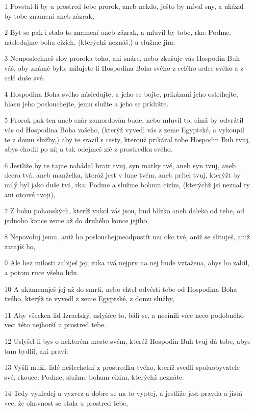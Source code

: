\par 1 Povstal-li by u prostred tebe prorok, aneb nekdo, ješto by míval sny, a ukázal by tobe znamení aneb zázrak,
\par 2 Byt se pak i stalo to znamení aneb zázrak, a mluvil by tobe, rka: Podme, následujme bohu cizích, (kterýchž neznáš,) a služme jim:
\par 3 Neuposlechneš slov proroka toho, ani snáre, nebo zkušuje vás Hospodin Buh váš, aby známé bylo, milujete-li Hospodina Boha svého z celého srdce svého a z celé duše své.
\par 4 Hospodina Boha svého následujte, a jeho se bojte, prikázaní jeho ostríhejte, hlasu jeho poslouchejte, jemu služte a jeho se prídržte.
\par 5 Prorok pak ten aneb snár zamordován bude, nebo mluvil to, címž by odvrátil vás od Hospodina Boha vašeho, (kterýž vyvedl vás z zeme Egyptské, a vykoupil te z domu služby,) aby te srazil s cesty, kterouž prikázal tobe Hospodin Buh tvuj, abys chodil po ní; a tak odejmeš zlé z prostredku svého.
\par 6 Jestliže by te tajne nabádal bratr tvuj, syn matky tvé, aneb syn tvuj, aneb dcera tvá, aneb manželka, kteráž jest v lune tvém, aneb prítel tvuj, kterýžt by milý byl jako duše tvá, rka: Podme a služme bohum cizím, (kterýchž jsi neznal ty ani otcové tvoji),
\par 7 Z bohu pohanských, kteríž vukol vás jsou, bud blízko aneb daleko od tebe, od jednoho konce zeme až do druhého konce jejího,
\par 8 Nepovoluj jemu, aniž ho poslouchej;neodpustít mu oko tvé, aniž se slituješ, aniž zatajíš ho,
\par 9 Ale bez milosti zabiješ jej; ruka tvá nejprv na nej bude vztažena, abys ho zabil, a potom ruce všeho lidu.
\par 10 A ukamenuješ jej až do smrti, nebo chtel odvésti tebe od Hospodina Boha tvého, kterýž te vyvedl z zeme Egyptské, z domu služby,
\par 11 Aby všecken lid Izraelský, uslyšíce to, báli se, a necinili více neco podobného veci této nejhorší u prostred tebe.
\par 12 Uslyšel-li bys o nekterém meste svém, kteréž Hospodin Buh tvuj dá tobe, abys tam bydlil, ani praví:
\par 13 Vyšli muži, lidé nešlechetní z prostredku tvého, kteríž svedli spoluobyvatele své, rkouce: Podme, služme bohum cizím, kterýchž neznáte:
\par 14 Tedy vyhledej a vyzvez a dobre se na to vyptej, a jestliže jest pravda a jistá vec, že ohavnost se stala u prostred tebe,
